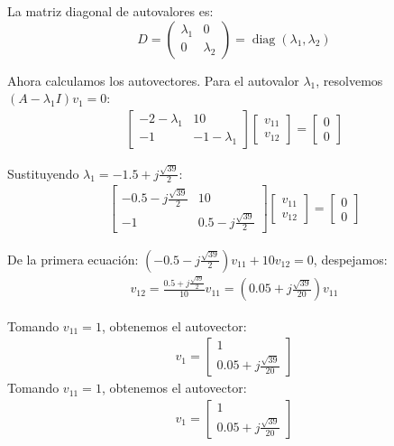 \documentclass[
  11pt,
  letterpaper,
   addpoints,
   answers
  ]{exam}
\begin{document}
\begin{solution}
La matriz diagonal de autovalores es:
\begin{equation}
  D = \begin{pmatrix} \lambda_1 & 0 \\ 0 & \lambda_2 \end{pmatrix} = \operatorname{diag}(\lambda_1,\lambda_2)
\end{equation}

Ahora calculamos los autovectores. Para el autovalor $\lambda_1$, resolvemos $(A - \lambda_1 I)v_1 = 0$:
\begin{align}
  \begin{bmatrix}
    -2 - \lambda_1 & 10 \\
    -1 & -1 - \lambda_1
  \end{bmatrix}
  \begin{bmatrix}
    v_{11} \\ v_{12}
  \end{bmatrix}
  = \begin{bmatrix}
    0 \\ 0
  \end{bmatrix}
\end{align}

Sustituyendo $\lambda_1 = -1.5 + j\frac{\sqrt{39}}{2}$:
\begin{align}
  \begin{bmatrix}
    -0.5 - j\frac{\sqrt{39}}{2} & 10 \\
    -1 & 0.5 - j\frac{\sqrt{39}}{2}
  \end{bmatrix}
  \begin{bmatrix}
    v_{11} \\ v_{12}
  \end{bmatrix}
  = \begin{bmatrix}
    0 \\ 0
  \end{bmatrix}
\end{align}

De la primera ecuación: $\left(-0.5 - j\frac{\sqrt{39}}{2}\right)v_{11} + 10v_{12} = 0$, despejamos:
\begin{align}
v_{12} = \frac{0.5 + j\frac{\sqrt{39}}{2}}{10}v_{11} = \left(0.05 + j\frac{\sqrt{39}}{20}\right)v_{11}
\end{align}

Tomando $v_{11}=1$, obtenemos el autovector:
\begin{align}
  v_1 = \begin{bmatrix} 1 \\ 0.05 + j\frac{\sqrt{39}}{20} \end{bmatrix}
\end{align}
Tomando $v_{11}=1$, obtenemos el autovector:
\begin{align}
  v_1 = \begin{bmatrix} 1 \\ 0.05 + j\frac{\sqrt{39}}{20} \end{bmatrix}
\end{align}


\end{solution}
\end{document}
